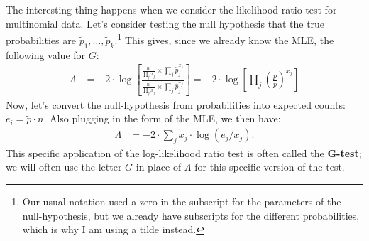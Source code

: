 \documentclass{tufte-handout}
\begin{document}
The interesting thing happens when we consider the likelihood-ratio
test for multinomial data. Let's consider testing the null hypothesis
that the true probabilities are $\tilde{p}_1, \ldots, \tilde{p}_k$.\footnote{
  Our usual notation used a zero in the subscript for the parameters of
  the null-hypothesis, but we already have subscripts for the different
  probabilities, which is why I am using a tilde instead.
}
This gives, since we already know the MLE, the following value for $G$:
\begin{align*}
\Lambda &= -2 \cdot \log \left[ \frac{
  \frac{n!}{\prod_j x_j} \times \prod_j \tilde{p}_j^{x_j}
}{
  \frac{n!}{\prod_j x_j} \times \prod_j \hat{p}_j^{x_j}
} \right] = -2 \cdot \log \left[ \prod_j \left( \frac{\tilde{p}}{\hat{p}} \right)^{x_j} \right]
\end{align*}
Now, let's convert the null-hypothesis from probabilities into expected
counts: $e_i = \tilde{p} \cdot n$. Also plugging in the form of the MLE,
we then have:
\begin{align*}
\Lambda &= -2 \cdot \sum_j x_j \cdot \log(e_j / x_j).
\end{align*}
This specific application of the log-likelihood ratio test is often called
the \textbf{G-test}; we will often use the letter $G$ in place of $\Lambda$
for this specific version of the test.
\end{document}

